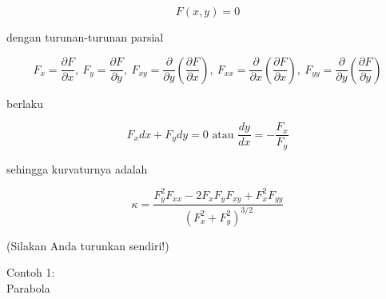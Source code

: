 \documentclass[12pt,arial,letterpaper]{book}
\begin{document}
\begin{eulernootebook}
\begin{eulercomment}
\begin{eulercomment}
\begin{eulernootebook}
\begin{eulercomment}
\begin{eulercomment}
\begin{eulercomment}
\begin{eulercomment}
\begin{eulercomment}
\begin{eulercomment}
\begin{eulernotebook}
\begin{eulercomment}
\begin{eulercomment}
\begin{eulercomment}
\begin{eulercomment}
\begin{eulercomment}
\begin{eulercomment}
\begin{eulercomment}
\begin{eulercomment}
\begin{eulercomment}
\begin{eulercomment}
\begin{eulercomment}
\begin{eulercomment}
\begin{eulercomment}
\begin{eulercomment}
\begin{eulercomment}
\begin{eulercomment}
\begin{eulercomment}
\begin{eulercomment}
\begin{eulercomment}
\begin{eulercomment}
\begin{eulercomment}
\end{eulercomment}
\begin{eulerformula}
\[
F(x,y)=0
\]
\end{eulerformula}
\begin{eulercomment}
dengan turunan-turunan parsial

\end{eulercomment}
\begin{eulerformula}
\[
F_x=\frac{\partial F}{\partial x},\ F_y=\frac{\partial F}{\partial y},\ F_{xy}=\frac{\partial}{\partial y}\left(\frac{\partial F}{\partial x}\right),\ F_{xx}=\frac{\partial}{\partial x}\left(\frac{\partial F}{\partial x}\right),\ F_{yy}=\frac{\partial}{\partial y}\left(\frac{\partial F}{\partial y}\right)
\]
\end{eulerformula}
\begin{eulercomment}
berlaku

\end{eulercomment}
\begin{eulerformula}
\[
F_x dx+ F_y dy = 0\text{ atau } \frac{dy}{dx}=-\frac{F_x}{F_y}
\]
\end{eulerformula}
\begin{eulercomment}
sehingga kurvaturnya adalah

\end{eulercomment}
\begin{eulerformula}
\[
\kappa =\frac {F_y^2F_{xx}-2F_xF_yF_{xy}+F_x^2F_{yy}}{\left(F_x^2+F_y^2\right)^{3/2}}
\]
\end{eulerformula}
\begin{eulercomment}
(Silakan Anda turunkan sendiri!)

Contoh 1:\\
Parabola


\end{eulercomment}
\end{eulercomment}
\end{eulercomment}
\end{eulercomment}
\end{eulercomment}
\end{eulercomment}
\end{eulercomment}
\end{eulercomment}
\end{eulercomment}
\end{eulercomment}
\end{eulercomment}
\end{eulercomment}
\end{eulercomment}
\end{eulercomment}
\end{eulercomment}
\end{eulercomment}
\end{eulercomment}
\end{eulercomment}
\end{eulercomment}
\end{eulercomment}
\end{eulercomment}
\end{eulernotebook}
\end{eulercomment}
\end{eulercomment}
\end{eulercomment}
\end{eulercomment}
\end{eulercomment}
\end{eulercomment}
\end{eulernootebook}
\end{eulercomment}
\end{eulercomment}
\end{eulernootebook}
\end{document}
